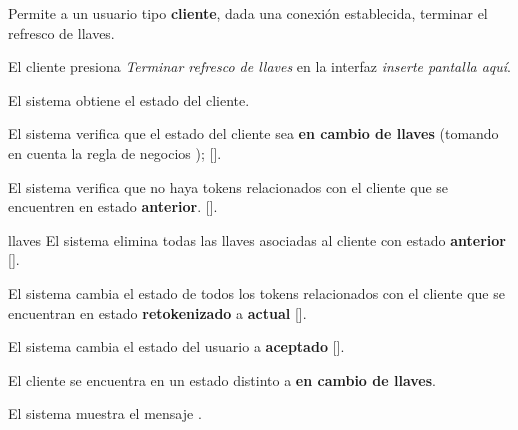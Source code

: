 %
%

{
  Permite a un usuario tipo \textbf{cliente}, dada una conexión establecida,
  terminar el refresco de llaves.

  \begin{trayectoriaPrincipal}

    \item El cliente presiona \textit{Terminar refresco de llaves} en la
      interfaz \textit{inserte pantalla aquí}.

    \item El sistema obtiene el estado del cliente.

    \item El sistema verifica que el estado del cliente sea
      \textbf{en cambio de llaves} (tomando en cuenta la regla de negocios
      );
      [].

    \item El sistema verifica que no haya tokens relacionados con el cliente
      que se encuentren en estado \textbf{anterior}.
      [].

    \item[llaves] El sistema elimina todas las llaves asociadas al cliente con
      estado \textbf{anterior} [].

    \item El sistema cambia el estado de todos los tokens relacionados con el
      cliente que se encuentran en estado \textbf{retokenizado} a
      \textbf{actual} [].

    \item El sistema cambia el estado del usuario a
      \textbf{aceptado} [].

  \end{trayectoriaPrincipal}

  \begin{trayectoriaAlternativa}
    {El cliente se encuentra en un estado distinto a
      \textbf{en cambio de llaves}.}

    \item El sistema muestra el mensaje
      .


\end{trayectoriaAlternativa}}
